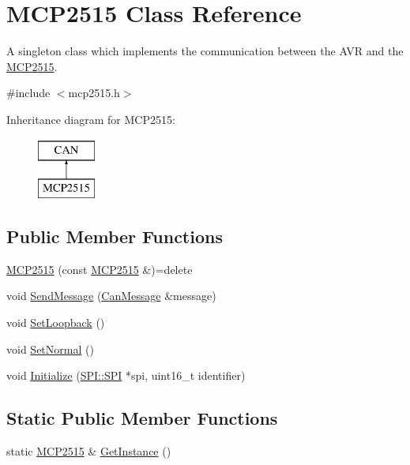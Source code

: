 \hypertarget{class_m_c_p2515}{}\section{M\+C\+P2515 Class Reference}
\label{class_m_c_p2515}


A singleton class which implements the communication between the A\+VR and the \hyperlink{class_m_c_p2515}{M\+C\+P2515}.  




{\ttfamily \#include $<$mcp2515.\+h$>$}

Inheritance diagram for M\+C\+P2515\+:\begin{figure}[H]
\begin{center}
\leavevmode
\includegraphics[height=2.000000cm]{class_m_c_p2515}
\end{center}
\end{figure}
\subsection*{Public Member Functions}
\begin{DoxyCompactItemize}
\item 
\hyperlink{class_m_c_p2515_a8cd4111604b740feb758bd4d077f4fb8}{M\+C\+P2515} (const \hyperlink{class_m_c_p2515}{M\+C\+P2515} \&)=delete
\item 
void \hyperlink{class_m_c_p2515_ade69da887eb514530ef5f73c0c3b0130}{Send\+Message} (\hyperlink{struct_can_message}{Can\+Message} \&message)
\item 
void \hyperlink{class_m_c_p2515_a7aac5fdb713b83933391348f1188f2b9}{Set\+Loopback} ()
\item 
void \hyperlink{class_m_c_p2515_a58601a9d30863ebac441d641ddfac44e}{Set\+Normal} ()
\item 
void \hyperlink{class_m_c_p2515_aff0381b69d9e68688cde4608d716bd25}{Initialize} (\hyperlink{class_s_p_i_1_1_s_p_i}{S\+P\+I\+::\+S\+PI} $\ast$spi, uint16\+\_\+t identifier)
\end{DoxyCompactItemize}
\subsection*{Static Public Member Functions}
\begin{DoxyCompactItemize}
\item 
static \hyperlink{class_m_c_p2515}{M\+C\+P2515} \& \hyperlink{class_m_c_p2515_a3f53839a9258086fd21e2fc4190de60d}{Get\+Instance} ()
\end{DoxyCompactItemize}
